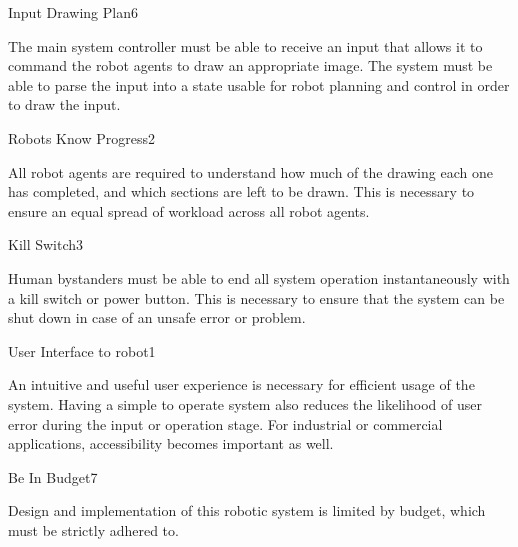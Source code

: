 \begin{functional_requirement}{Input Drawing Plan}{6}
\item The main system controller must be able to receive an input that allows it to command the robot agents to draw an appropriate image. The system must be able to parse the input into a state usable for robot planning and control in order to draw the input. 
\end{functional_requirement}

\begin{functional_requirement}{Robots Know Progress}{2}
\item All robot agents are required to understand how much of the drawing each one has completed, and which sections are left to be drawn. This is necessary to ensure an equal spread of workload across all robot agents. 
\end{functional_requirement}

\begin{functional_requirement}{Kill Switch}{3}
\item Human bystanders must be able to end all system operation instantaneously with a kill switch or power button. This is necessary to ensure that the system can be shut down in case of an unsafe error or problem. 
\end{functional_requirement}

\begin{functional_requirement}{User Interface to robot}{1}
\item An intuitive and useful user experience is necessary for efficient usage of the system. Having a simple to operate system also reduces the likelihood of user error during the input or operation stage. For industrial or commercial applications, accessibility becomes important as well. 
\end{functional_requirement}

\begin{functional_requirement}{Be In Budget}{7}
\item Design and implementation of this robotic system is limited by budget, which must be strictly adhered to. 
\end{functional_requirement}

